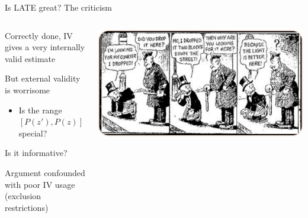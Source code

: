 \documentclass[notes,11pt, aspectratio=169]{beamer}
\newenvironment{wideitemize}{\itemize\addtolength{\itemsep}{10pt}}{\enditemize}
\begin{document}
\begin{frame}{Is LATE great? The criticism}
  \begin{columns}[T] %
    \begin{column}{0.3\textwidth}
      \begin{wideitemize}
      \item Correctly done, IV gives a very internally valid estimate
      \item But external validity is worrisome
        \begin{itemize}
        \item Is the range $[P(z'), P(z)]$ special?
        \end{itemize}
      \item Is it informative?
      \item Argument confounded with poor IV usage (exclusion restrictions)
      \end{wideitemize}
\end{column}
\begin{column}{0.7\textwidth}
  \begin{center}
    \includegraphics[width=\linewidth]{images/streetlight.jpeg}
  \end{center}
\end{column}
\end{columns}
  
\end{frame}
\end{document}
